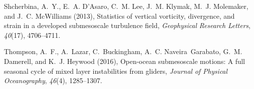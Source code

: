 \documentclass[grl]{agutex2015}
\begin{document}
\begin{article}
\begin{thebibliography}{18}
Shcherbina, A.~Y., E.~A. D'Asaro, C.~M. Lee, J.~M. Klymak, M.~J. Molemaker, and
  J.~C. McWilliams (2013), {Statistics of vertical vorticity, divergence, and
  strain in a developed submesoscale turbulence field}, \textit{Geophysical
  Research Letters}, \textit{40}(17), 4706--4711.

Thompson, A.~F., A.~Lazar, C.~Buckingham, A.~C. Naveira~Garabato, G.~M.
  Damerell, and K.~J. Heywood (2016), {Open-ocean submesoscale motions: A full
  seasonal cycle of mixed layer instabilities from gliders}, \textit{Journal of
  Physical Oceanography}, \textit{46}(4), 1285--1307.

\end{thebibliography}


%
%
%
%
%
%
%


%
%
%
%


\end{article}
\end{document}
